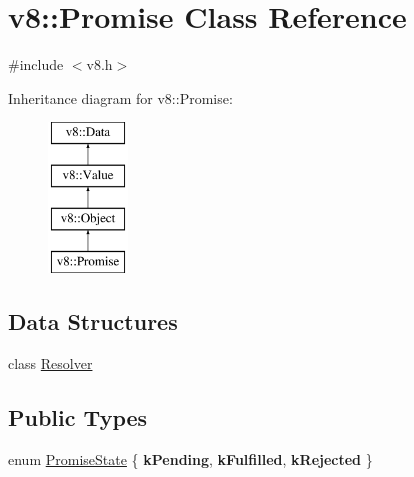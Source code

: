 \hypertarget{classv8_1_1Promise}{}\section{v8\+:\+:Promise Class Reference}
\label{classv8_1_1Promise}


{\ttfamily \#include $<$v8.\+h$>$}

Inheritance diagram for v8\+:\+:Promise\+:\begin{figure}[H]
\begin{center}
\leavevmode
\includegraphics[height=4.000000cm]{classv8_1_1Promise}
\end{center}
\end{figure}
\subsection*{Data Structures}
\begin{DoxyCompactItemize}
\item 
class \mbox{\hyperlink{classv8_1_1Promise_1_1Resolver}{Resolver}}
\end{DoxyCompactItemize}
\subsection*{Public Types}
\begin{DoxyCompactItemize}
\item 
enum \mbox{\hyperlink{classv8_1_1Promise_a0c357b9d99a634f98a5a203b0a322544}{Promise\+State}} \{ {\bfseries k\+Pending}, 
{\bfseries k\+Fulfilled}, 
{\bfseries k\+Rejected}
 \}
\end{DoxyCompactItemize}
